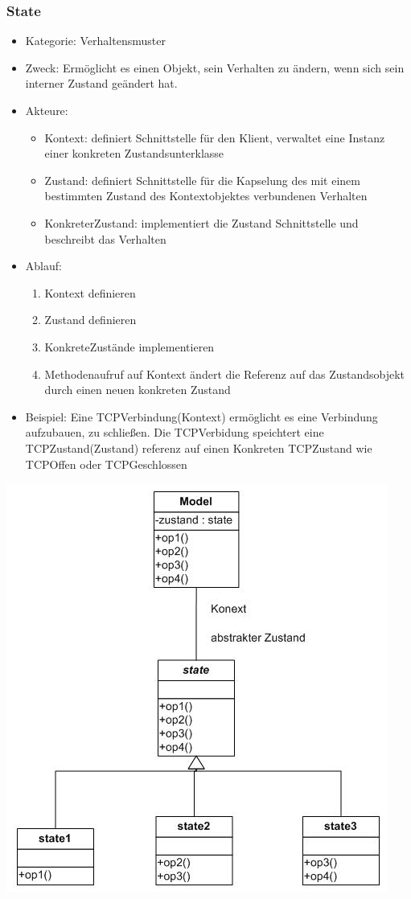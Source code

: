 \documentclass[11pt, fleqn, a4paper, leqno]{scrartcl} %
\begin{document}
		\subsubsection{State}
			\begin{itemize}
				\item Kategorie: Verhaltensmuster
				\item Zweck: Ermöglicht es einen Objekt, sein Verhalten zu ändern, wenn sich sein interner Zustand geändert hat.
				\item Akteure: 
					\begin{itemize}
						\item Kontext: definiert Schnittstelle für den Klient, verwaltet eine Instanz einer konkreten Zustandsunterklasse
						\item Zustand: definiert Schnittstelle für die Kapselung des mit einem bestimmten Zustand des Kontextobjektes verbundenen Verhalten
						\item KonkreterZustand: implementiert die Zustand Schnittstelle und beschreibt das Verhalten
					\end{itemize}
				\item Ablauf:
					\begin{enumerate}
						\item Kontext definieren
						\item Zustand definieren
						\item KonkreteZustände implementieren
						\item Methodenaufruf auf Kontext ändert die Referenz auf das Zustandsobjekt durch einen neuen konkreten Zustand
					\end{enumerate}
				\item Beispiel: Eine TCPVerbindung(Kontext) ermöglicht es eine Verbindung aufzubauen, zu schließen. Die TCPVerbidung speichtert eine TCPZustand(Zustand) referenz auf einen Konkreten TCPZustand wie TCPOffen oder TCPGeschlossen
			\end{itemize}
			\includegraphics[scale=0.6]{images/state.jpg}
			\newpage
\end{document}
